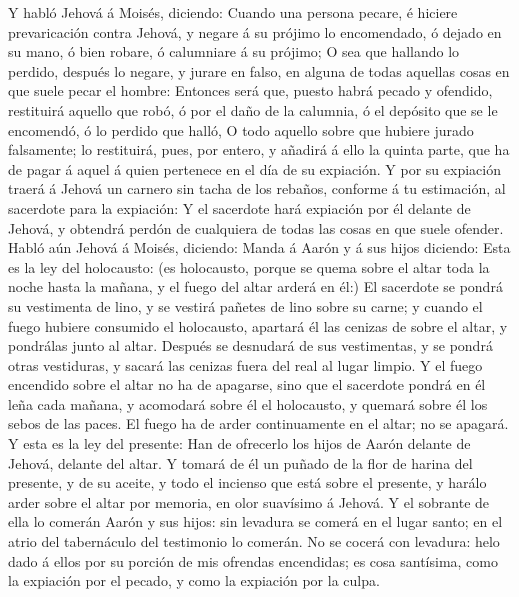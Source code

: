  Y habló Jehová á Moisés, diciendo:  Cuando
una persona pecare, é hiciere prevaricación contra Jehová, y negare á su
prójimo lo encomendado, ó dejado en su mano, ó bien robare, ó calumniare
á su prójimo;  O sea que hallando lo perdido, después lo
negare, y jurare en falso, en alguna de todas aquellas cosas en que
suele pecar el hombre:  Entonces será que, puesto habrá
pecado y ofendido, restituirá aquello que robó, ó por el daño de la
calumnia, ó el depósito que se le encomendó, ó lo perdido que halló,
 O todo aquello sobre que hubiere jurado falsamente; lo
restituirá, pues, por entero, y añadirá á ello la quinta parte, que ha
de pagar á aquel á quien pertenece en el día de su expiación.
 Y por su expiación traerá á Jehová un carnero sin tacha
de los rebaños, conforme á tu estimación, al sacerdote para la
expiación:  Y el sacerdote hará expiación por él delante
de Jehová, y obtendrá perdón de cualquiera de todas las cosas en que
suele ofender.  Habló aún Jehová á Moisés, diciendo:
 Manda á Aarón y á sus hijos diciendo: Esta es la ley del
holocausto: (es holocausto, porque se quema sobre el altar toda la noche
hasta la mañana, y el fuego del altar arderá en él:)  El
sacerdote se pondrá su vestimenta de lino, y se vestirá pañetes de lino
sobre su carne; y cuando el fuego hubiere consumido el holocausto,
apartará él las cenizas de sobre el altar, y pondrálas junto al altar.
 Después se desnudará de sus vestimentas, y se pondrá
otras vestiduras, y sacará las cenizas fuera del real al lugar limpio.
 Y el fuego encendido sobre el altar no ha de apagarse,
sino que el sacerdote pondrá en él leña cada mañana, y acomodará sobre
él el holocausto, y quemará sobre él los sebos de las paces.
 El fuego ha de arder continuamente en el altar; no se
apagará.  Y esta es la ley del presente: Han de ofrecerlo
los hijos de Aarón delante de Jehová, delante del altar. 
Y tomará de él un puñado de la flor de harina del presente, y de su
aceite, y todo el incienso que está sobre el presente, y harálo arder
sobre el altar por memoria, en olor suavísimo á Jehová. 
Y el sobrante de ella lo comerán Aarón y sus hijos: sin levadura se
comerá en el lugar santo; en el atrio del tabernáculo del testimonio lo
comerán.  No se cocerá con levadura: helo dado á ellos
por su porción de mis ofrendas encendidas; es cosa santísima, como la
expiación por el pecado, y como la expiación por la culpa.
